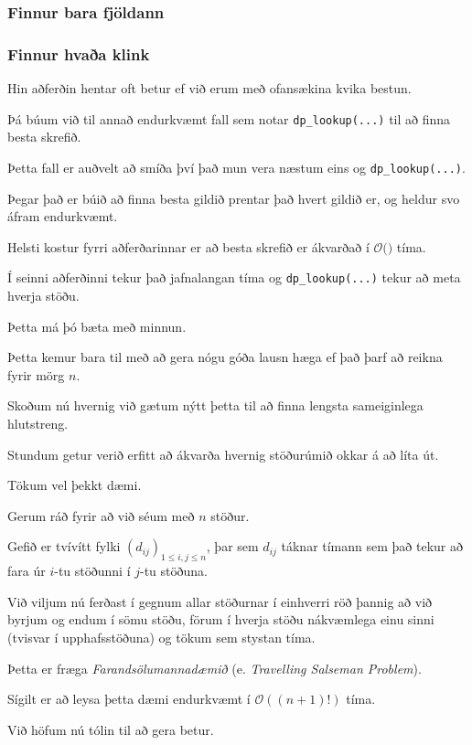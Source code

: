 {
	\frametitle{Finnur bara fjöldann}
}

{
	\frametitle{Finnur hvaða klink}
}

{
	{
		\item<1-> Hin aðferðin hentar oft betur ef við erum með ofansækina kvika bestun.
		\item<2-> Þá búum við til annað endurkvæmt fall sem notar \texttt{dp\_lookup(...)} til að finna besta skrefið.
		\item<3-> Þetta fall er auðvelt að smíða því það mun vera næstum eins og \texttt{dp\_lookup(...)}.
		\item<4-> Þegar það er búið að finna besta gildið prentar það hvert gildið er, og heldur svo áfram endurkvæmt.
	}
}

{
}

{
	{
		\item<1-> Helsti kostur fyrri aðferðarinnar er að besta skrefið er ákvarðað í $\mathcal{O}($$)$ tíma.
		\item<3-> Í seinni aðferðinni tekur það jafnalangan tíma og \texttt{dp\_lookup(...)} tekur að meta hverja stöðu.
		\item<4-> Þetta má þó bæta með minnun.
		\item<5-> Þetta kemur bara til með að gera nógu góða lausn hæga ef það þarf að reikna fyrir mörg $n$.
		\item<6-> Skoðum nú hvernig við gætum nýtt þetta til að finna lengsta sameiginlega hlutstreng.
	}
}

{
}

{
	{
		\item<1-> Stundum getur verið erfitt að ákvarða hvernig stöðurúmið okkar á að líta út.
		\item<2-> Tökum vel þekkt dæmi.
		\item<3-> Gerum ráð fyrir að við séum með $n$ stöður.
		\item<4-> Gefið er tvívítt fylki $(d_{ij})_{1 \leq i, j \leq n}$,
					þar sem $d_{ij}$ táknar tímann sem það tekur að fara úr $i$-tu stöðunni í $j$-tu stöðuna.
		\item<5-> Við viljum nú ferðast í gegnum allar stöðurnar í einhverri röð þannig að við	
					byrjum og endum í sömu stöðu, förum í hverja stöðu nákvæmlega einu sinni (tvisvar í upphafsstöðuna) og tökum sem stystan tíma.
		\item<6-> Þetta er fræga \emph{Farandsölumannadæmið} (e. \emph{Travelling Salseman Problem}).
		\item<7-> Sígilt er að leysa þetta dæmi endurkvæmt í $\mathcal{O}((n + 1)!)$ tíma.
		\item<8-> Við höfum nú tólin til að gera betur.
	}
}

